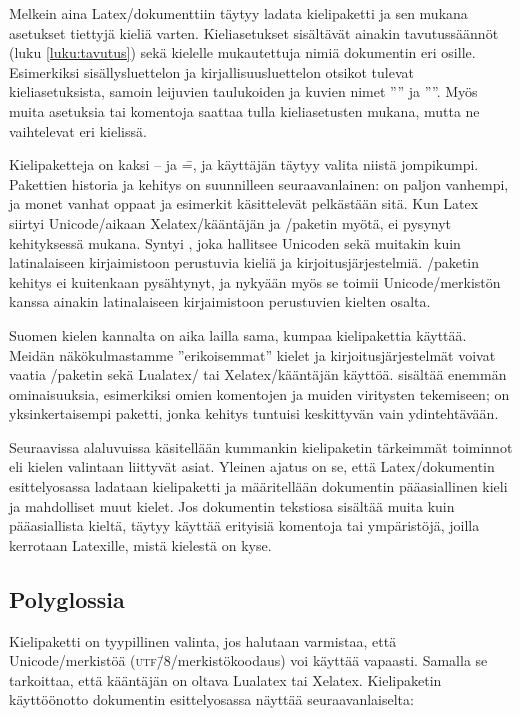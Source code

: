 Melkein aina Latex\-/dokumenttiin täytyy ladata kielipaketti ja sen
mukana asetukset tiettyjä kieliä varten. Kieliasetukset sisältävät
ainakin tavutussäännöt (luku \ref{luku:tavutus}) sekä kielelle
mukautettuja nimiä dokumentin eri osille. Esimerkiksi sisällysluettelon
ja kirjallisuusluettelon otsikot tulevat kieliasetuksista, samoin
leijuvien taulukoiden ja kuvien nimet ''\tablename'' ja ''\figurename''.
Myös muita asetuksia tai komentoja saattaa tulla kieliasetusten mukana,
mutta ne vaihtelevat eri kielissä.

Kielipaketteja on kaksi --  ja
 \==, ja käyttäjän täytyy
valita niistä jompikumpi. Pakettien historia ja kehitys on suunnilleen
seuraavanlainen:  on paljon vanhempi, ja monet vanhat
oppaat ja esimerkit käsittelevät pelkästään sitä. Kun Latex siirtyi
Unicode\-/aikaan Xelatex\-/kääntäjän ja \-/paketin
myötä,  ei pysynyt kehityksessä mukana. Syntyi
, joka hallitsee Unicoden sekä muitakin kuin
latinalaiseen kirjaimistoon perustuvia kieliä ja kirjoitusjärjestelmiä.
\-/paketin kehitys ei kuitenkaan pysähtynyt, ja nykyään
myös se toimii Unicode\-/merkistön kanssa ainakin latinalaiseen
kirjaimistoon perustuvien kielten osalta.

Suomen kielen kannalta on aika lailla sama, kumpaa kielipakettia
käyttää. Meidän näkökulmastamme ''erikoisemmat'' kielet ja
kirjoitusjärjestelmät voivat vaatia \-/paketin sekä
Lualatex\-/{} tai Xelatex\-/kääntäjän käyttöä.  sisältää
enemmän ominaisuuksia, esimerkiksi omien komentojen ja muiden viritysten
tekemiseen;  on yksinkertaisempi paketti, jonka
kehitys tuntuisi keskittyvän vain ydintehtävään.

Seuraavissa alaluvuissa käsitellään kummankin kielipaketin tärkeimmät
toiminnot eli kielen valintaan liittyvät asiat. Yleinen ajatus on se,
että Latex\-/dokumentin esittelyosassa ladataan kielipaketti ja
määritellään dokumentin pääasiallinen kieli ja mahdolliset muut kielet.
Jos dokumentin tekstiosa sisältää muita kuin pääasiallista kieltä,
täytyy käyttää erityisiä komentoja tai ympäristöjä, joilla kerrotaan
Latexille, mistä kielestä on kyse.

\subsection{Polyglossia}

Kielipaketti  on tyypillinen valinta, jos halutaan
varmistaa, että Unicode\-/merkistöä (\textsc{utf\=/8}\-/merkistökoodaus)
voi käyttää vapaasti. Samalla se tarkoittaa, että kääntäjän on oltava
Lualatex tai Xelatex. Kielipaketin käyttöönotto dokumentin
esittelyosassa näyttää seuraavanlaiselta:

